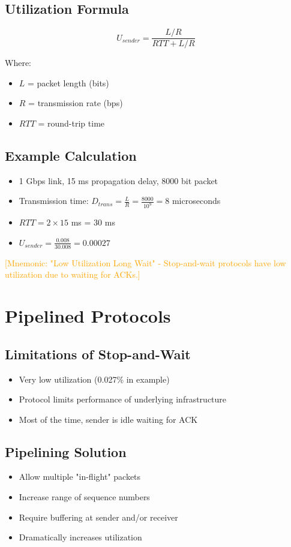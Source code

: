 \documentclass[12pt]{article}
\begin{document}
\subsection{Utilization Formula}
\[
    U_{sender} = \frac{L/R}{RTT + L/R}
\]

Where:
\begin{itemize}
    \item $L$ = packet length (bits)
    \item $R$ = transmission rate (bps)
    \item $RTT$ = round-trip time
\end{itemize}

\subsection{Example Calculation}
\begin{itemize}
    \item 1 Gbps link, 15 ms propagation delay, 8000 bit packet
    \item Transmission time: $D_{trans} = \frac{L}{R} = \frac{8000}{10^9} = 8$ microseconds
    \item $RTT = 2 \times 15$ ms = 30 ms
    \item $U_{sender} = \frac{0.008}{30.008} = 0.00027$
\end{itemize}

\textcolor{orange}{[Mnemonic: "Low Utilization Long Wait" - Stop-and-wait protocols have low utilization due to waiting for ACKs.]}

\section{Pipelined Protocols}

\subsection{Limitations of Stop-and-Wait}
\begin{itemize}
    \item Very low utilization (0.027\% in example)
    \item Protocol limits performance of underlying infrastructure
    \item Most of the time, sender is idle waiting for ACK
\end{itemize}

\subsection{Pipelining Solution}
\begin{itemize}
    \item Allow multiple "in-flight" packets
    \item Increase range of sequence numbers
    \item Require buffering at sender and/or receiver
    \item Dramatically increases utilization
\end{itemize}
\end{document}
